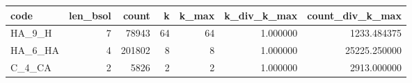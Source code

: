 \begin{tabular}{lrrrrrr}
\toprule
code & len_bsol & count & k & k_max & k_div_k_max & count_div_k_max \\
\midrule
HA_9_H & 7 & 78943 & 64 & 64 & 1.000000 & 1233.484375 \\
HA_6_HA & 4 & 201802 & 8 & 8 & 1.000000 & 25225.250000 \\
C_4_CA & 2 & 5826 & 2 & 2 & 1.000000 & 2913.000000 \\
\bottomrule
\end{tabular}
